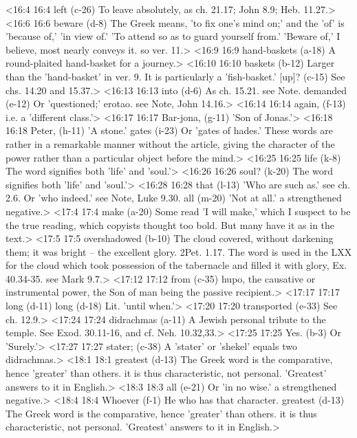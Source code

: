 <16:4 16:4  left (c-26)  To leave absolutely, as ch. 21.17; John 8.9; Heb. 11.27.>
<16:6 16:6  beware (d-8)  The Greek means, 'to fix one's mind on;' and the 'of' is  'because of,' 'in view of.' 'To attend so as to guard yourself  from.' 'Beware of,' I believe, most nearly conveys it. so ver.  11.>
<16:9 16:9  hand-baskets (a-18)  A round-plaited hand-basket for a journey.>
<16:10 16:10  baskets (b-12)  Larger than the 'hand-basket' in ver. 9. It is particularly a  'fish-basket.'
  [up]? (c-15)  See chs. 14.20 and 15.37.>
<16:13 16:13  into (d-6)  As ch. 15.21. see Note.
  demanded (e-12)  Or 'questioned;' erotao. see Note, John 14.16.>
<16:14 16:14  again, (f-13)  i.e. a 'different class.'>
<16:17 16:17  Bar-jona, (g-11)  'Son of Jonas.'>
<16:18 16:18  Peter, (h-11)  'A stone.'
  gates (i-23)  Or 'gates of hades.' These words are rather in a remarkable  manner without the article, giving the character of the power  rather than a particular object before the mind.>
<16:25 16:25  life (k-8) The word signifies both 'life' and 'soul.'>
<16:26 16:26  soul? (k-20)  The word signifies both 'life' and 'soul.'>
<16:28 16:28  that (l-13)  'Who are such as.' see ch. 2.6. Or 'who indeed.' see Note,  Luke 9.30.
  all (m-20)  'Not at all.' a strengthened negative.>
<17:4 17:4  make (a-20)  Some read 'I will make,' which I suspect to be the true  reading, which copyists thought too bold. But many have it as  in the text.>
<17:5 17:5  overshadowed (b-10)  The cloud covered, without darkening them; it was bright --  the excellent glory. 2Pet. 1.17. The word is used in the LXX  for the cloud which took possession of the tabernacle and  filled it with glory, Ex. 40.34-35. see Mark 9.7.>
<17:12 17:12  from (c-35)  hupo, the causative or instrumental power, the Son of man  being the passive recipient.>
<17:17 17:17  long (d-11)  long (d-18)  Lit. 'until when.'>
<17:20 17:20  transported (e-33)  See ch. 12.9.>
<17:24 17:24  didrachmas (a-11)  A Jewish personal tribute to the temple. See Exod. 30.11-16,  and cf. Neh. 10.32,33.>
<17:25 17:25  Yes. (b-3)  Or 'Surely.'>
<17:27 17:27  stater; (c-38)  A 'stater' or 'shekel' equals two didrachmas.>
<18:1 18:1  greatest (d-13)  The Greek word is the comparative, hence 'greater' than  others. it is thus characteristic, not personal. 'Greatest'  answers to it in English.>
<18:3 18:3  all (e-21)  Or 'in no wise.' a strengthened negative.>
<18:4 18:4  Whoever (f-1)  He who has that character.
  greatest (d-13)  The Greek word is the comparative, hence 'greater' than  others. it is thus characteristic, not personal. 'Greatest'  answers to it in English.>
